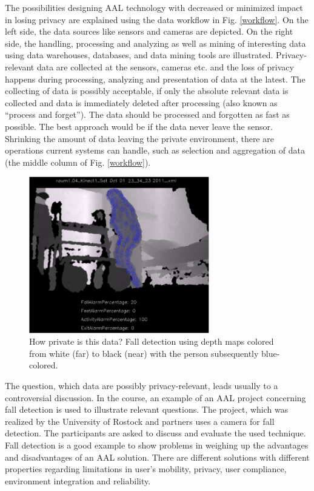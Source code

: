 \documentclass[runningheads,a4paper]{llncs}
\begin{document}
The possibilities designing AAL technology with decreased or minimized impact in losing privacy are explained using the data workflow in Fig. \ref{workflow}. On the left side, the data sources like sensors and cameras are depicted. On the right side, the handling, processing and analyzing as well as mining of interesting data using data warehouses, databases, and data mining tools are illustrated. Privacy-relevant data are collected at the sensors, cameras etc. and the loss of privacy happens during processing, analyzing and presentation of data at the latest. The collecting of data is possibly acceptable, if only the absolute relevant data is collected and data is immediately deleted after processing (also known as ``process and forget''). The data should be processed and forgotten as fast as possible. The best approach would be if the data never leave the sensor. Shrinking the amount of data leaving the private environment, there are operations current systems can handle, such as selection and aggregation of data (the middle column of Fig. \ref{workflow}).

\begin{figure}[ht]
    \centering
        \includegraphics[width=0.7\textwidth]{figures/kinect.png}
    \caption{How private is this data? Fall detection using depth maps colored from white (far) to black (near) with the person subsequently blue-colored.}
    \label{kinect}
\end{figure}

The question, which data are possibly privacy-relevant, leads usually to a controversial discussion. In the course, an example of an AAL project concerning fall detection is used to illustrate relevant questions. The project, which was realized by the University of Rostock and partners \cite{MPBS12} uses a camera for fall detection. The participants are asked to discuss and evaluate the used technique. Fall detection is a good example to show problems in weighing up the advantages and disadvantages of an AAL solution. There are different solutions with different properties regarding limitations in user's mobility, privacy, user compliance, environment integration and reliability.
\end{document}
